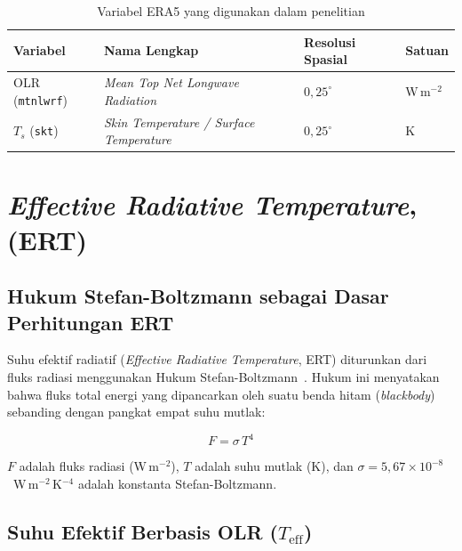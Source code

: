\documentclass[12pt,a4paper]{report}
\begin{document}
\begin{table}[htbp]
  \centering
  \caption{Variabel ERA5 yang digunakan dalam penelitian}
  \label{tab:era5_var}
  \begin{tabularx}{\textwidth}{>{\raggedright\arraybackslash}p{2.5cm}
                               >{\raggedright\arraybackslash}X
                               >{\centering\arraybackslash}p{2.2cm}
                               >{\centering\arraybackslash}p{1.5cm}}
    \toprule
    \textbf{Variabel} & \textbf{Nama Lengkap} &
    \textbf{Resolusi Spasial} & \textbf{Satuan} \\
    \midrule
    OLR (\texttt{mtnlwrf})  & \textit{Mean Top Net Longwave Radiation}              & $0{,}25^{\circ}$ & W\,m$^{-2}$ \\
$T_s$ (\texttt{skt}) & \textit{Skin Temperature / Surface Temperature} 		    & $0{,}25^{\circ}$ & K \\
    \bottomrule
  \end{tabularx}
\end{table}
 
\section{\textit{Effective Radiative Temperature}, (ERT)}
 
\subsection{Hukum Stefan-Boltzmann sebagai Dasar Perhitungan ERT}
 
Suhu efektif radiatif (\textit{Effective Radiative Temperature}, ERT) diturunkan
dari fluks radiasi menggunakan Hukum Stefan-Boltzmann~\cite{Stephens2012}.
Hukum ini menyatakan bahwa fluks total energi yang dipancarkan oleh suatu benda
hitam (\textit{blackbody}) sebanding dengan pangkat empat suhu mutlak:
 
\begin{equation}
  F = \sigma\, T^{4}
  \label{eq:stefan_boltzmann}
\end{equation}
 
\noindent
$F$ adalah fluks radiasi (W\,m$^{-2}$), $T$ adalah suhu mutlak (K), dan
$\sigma = 5{,}67 \times 10^{-8}$~W\,m$^{-2}$\,K$^{-4}$ adalah konstanta
Stefan-Boltzmann. 
 
\subsection{Suhu Efektif Berbasis OLR ($T_{\mathrm{eff}}$)}
 
\end{document}
